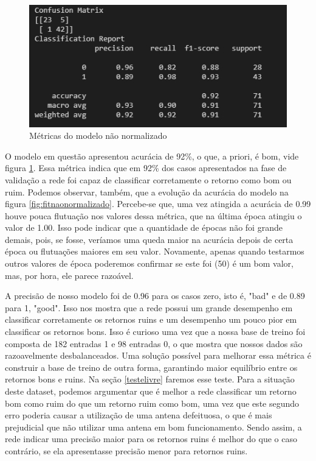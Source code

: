 \documentclass[12pt]{article}
\begin{document}
\begin{figure}[H]
	\centering
	\includegraphics[width=0.7\linewidth]{Imagens/resultadoNaoNormalizado}
	\caption{Métricas do modelo não normalizado}
	\label{fig:resultadonaonormalizado}
\end{figure}

O modelo em questão apresentou acurácia de 92\%, o que, a priori, é bom, vide figura \ref{fig:resultadonaonormalizado}. Essa métrica indica que em 92\% dos casos apresentados na fase de validação a rede foi capaz de classificar corretamente o retorno como bom ou ruim. Podemos observar, também, que a evolução da acurácia do modelo na figura \ref{fig:fitnaonormalizado}. Percebe-se que, uma vez atingida a acurácia de 0.99 houve pouca flutuação nos valores dessa métrica, que na última época atingiu o valor de 1.00. Isso pode indicar que a quantidade de épocas não foi grande demais, pois, se fosse, veríamos uma queda maior na acurácia depois de certa época ou flutuações maiores em seu valor. Novamente, apenas quando testarmos outros valores de época poderemos confirmar se este foi (50) é um bom valor, mas, por hora, ele parece razoável. 

A precisão de nosso modelo foi de 0.96 para os casos zero, isto é, "bad" e de 0.89 para 1, "good". Isso nos mostra que a rede possui um grande desempenho em classificar corretamente os retornos ruins e um desempenho um pouco pior em classificar os retornos bons. Isso é curioso uma vez que a nossa base de treino foi composta de 182 entradas 1 e 98 entradas 0, o que mostra que nossos dados são razoavelmente desbalanceados. Uma solução possível para melhorar essa métrica é construir a base de treino de outra forma, garantindo maior equilíbrio entre os retornos bons e ruins. Na seção \ref{testelivre} faremos esse teste. Para a situação deste dataset, podemos argumentar que é melhor a rede classificar um retorno bom como ruim do que um retorno ruim como bom, uma vez que este segundo erro poderia causar a utilização de uma antena defeituosa, o que é mais prejudicial que não utilizar uma antena em bom funcionamento. Sendo assim, a rede indicar uma precisão maior para os retornos ruins é melhor do que o caso contrário, se ela apresentasse precisão menor para retornos ruins.
\end{document}
